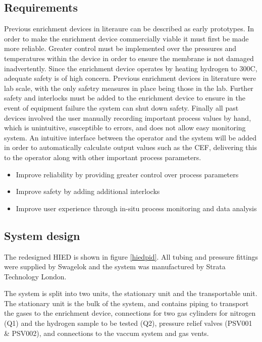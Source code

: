 \subsection{Requirements}
Previous enrichment devices in literaure can be described as early prototypes.\cite{Ahmed2010} \cite{Murugan2014} In order to make the enrichment device commercially viable it must first be made more reliable. Greater control must be implemented over the pressures and temperatures within the device in order to ensure the membrane is not damaged inadvertently. Since the enrichment device operates by heating hydrogen to 300\textdegree C, adequate safety is of high concern. Previous enrichment devices in literature were lab scale, with the only safetry measures in place being those in the lab. Further safety and interlocks must be added to the enrichment device to ensure in the event of equipment failure the system can shut down safety. Finally all past devices involved the user manually recording important process values by hand, which is unintuitive, susceptible to errors, and does not allow easy monitoring system. An intuitive interface between the operator and the system will be added in order to automatically calculate output values such as the CEF, delivering this to the operator along with other important process parameters. 

\begin{itemize}
    \item Improve reliability by providing greater control over process parameters
    \item Improve safety by adding additional interlocks
    \item Improve user experience through in-situ process monitoring and data analysis
\end{itemize}

\subsection{System design}
The redesigned HIED is shown in figure \ref{hiedpid}. All tubing and pressure fittings were supplied by Swagelok \cite{swagelok} and the system was manufactured by Strata Technology London. \cite{stratatechnology}

The system is split into two units, the stationary unit and the transportable unit. The stationary unit is the bulk of the system, and contains piping to transport the gases to the enrichment device, connections for two gas cylinders for nitrogen (Q1) and the hydrogen sample to be tested (Q2), pressure relief valves (PSV001 \& PSV002), and connections to the vaccum system and gas vents. 

